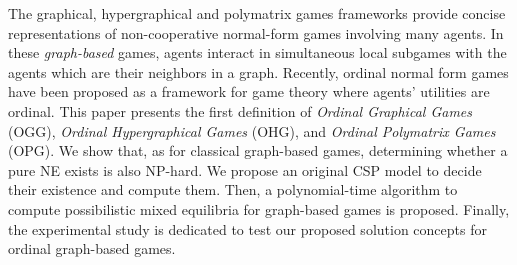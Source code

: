  
 The graphical, hypergraphical and polymatrix games frameworks provide concise representations of non-cooperative normal-form games involving many agents. In these {\em graph-based} games, agents interact in simultaneous local subgames with the agents which are their neighbors in a graph. 
Recently, ordinal normal form games have been proposed as a framework for game theory where agents' utilities are ordinal. 
This paper presents the first definition of \emph{Ordinal Graphical Games} (OGG),  \emph{Ordinal Hypergraphical Games} (OHG), and \emph{Ordinal Polymatrix Games} (OPG). 
We show that, as for classical graph-based games, determining whether a pure NE exists is also NP-hard. We propose an original CSP model to decide their existence and compute them.
Then, a polynomial-time algorithm to compute possibilistic mixed equilibria for graph-based games is proposed. Finally, the experimental study is dedicated to test our proposed solution concepts for ordinal graph-based games.


